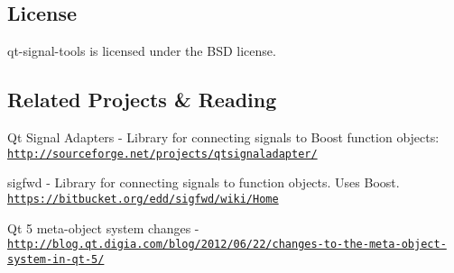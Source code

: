 \subsection*{License}

qt-\/signal-\/tools is licensed under the B\-S\-D license.

\subsection*{Related Projects \& Reading}


\begin{DoxyItemize}
\item Qt Signal Adapters -\/ Library for connecting signals to Boost function objects\-: \href{http://sourceforge.net/projects/qtsignaladapter/}{\tt http\-://sourceforge.\-net/projects/qtsignaladapter/}
\item sigfwd -\/ Library for connecting signals to function objects. Uses Boost. \href{https://bitbucket.org/edd/sigfwd/wiki/Home}{\tt https\-://bitbucket.\-org/edd/sigfwd/wiki/\-Home}
\item Qt 5 meta-\/object system changes -\/ \href{http://blog.qt.digia.com/blog/2012/06/22/changes-to-the-meta-object-system-in-qt-5/}{\tt http\-://blog.\-qt.\-digia.\-com/blog/2012/06/22/changes-\/to-\/the-\/meta-\/object-\/system-\/in-\/qt-\/5/} 
\end{DoxyItemize}